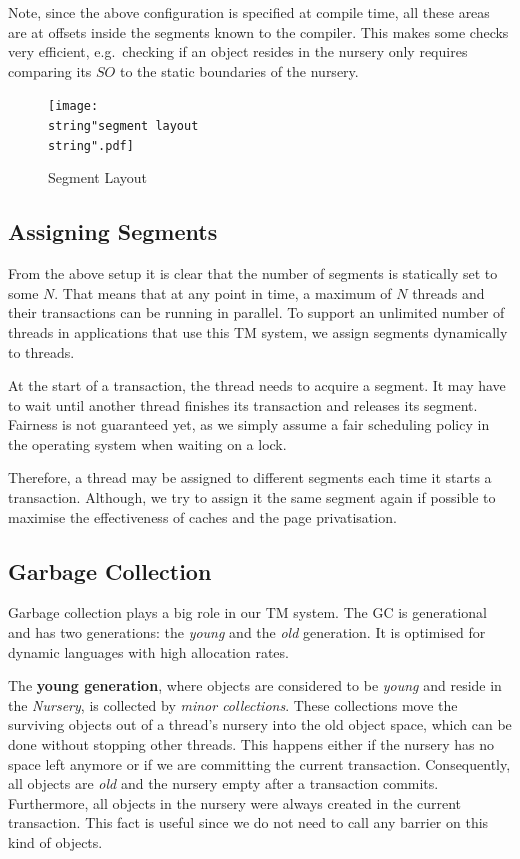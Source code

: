 \documentclass{sigplanconf}
\begin{document}
Note, since the above configuration is specified at compile time,
all these areas are at offsets inside the segments known to the
compiler. This makes some checks very efficient, e.g.\ checking
if an object resides in the nursery only requires comparing its $SO$
to the static boundaries of the nursery.


\begin{figure}[t]
  \centering
  \texttt{[image: \\string"segment layout\\string".pdf]}
  \caption{Segment Layout\label{fig:Segment-Layout}}
\end{figure}



\subsection{Assigning Segments}

From the above setup it is clear that the number of segments is
statically set to some $N$. That means that at any point in time, a
maximum of $N$ threads and their transactions can be running in
parallel.  To support an unlimited number of threads in applications
that use this TM system, we assign segments dynamically to threads.

At the start of a transaction, the thread needs to acquire a
segment. It may have to wait until another thread finishes its
transaction and releases its segment. Fairness is not guaranteed yet, as
we simply assume a fair scheduling policy in the operating system when
waiting on a lock.

Therefore, a thread may be assigned to different segments each time it
starts a transaction. Although, we try to assign it the same segment
again if possible to maximise the effectiveness of caches and the
page privatisation.



\subsection{Garbage Collection}

Garbage collection plays a big role in our TM system. The GC is
generational and has two generations: the \emph{young} and the
\emph{old} generation. It is optimised for dynamic languages with
high allocation rates.

The \textbf{young generation}, where objects are considered to be
\emph{young} and reside in the \emph{Nursery}, is collected by
\emph{minor collections}. These collections move the surviving objects
out of a thread's nursery into the old object space, which can be done
without stopping other threads. This happens either if the nursery has
no space left anymore or if we are committing the current
transaction. Consequently, all objects are \emph{old} and the nursery empty
after a transaction commits.  Furthermore, all objects in the nursery
were always created in the current transaction. This fact is useful
since we do not need to call any barrier on this kind of objects.
\end{document}
